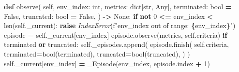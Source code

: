 \documentclass[
  american,
  11pt,
  letterpaper,
]{article}
\newenvironment{Shaded}{\begin{snugshade}}{\end{snugshade}}
\newcommand{\BuiltInTok}[1]{#1}
\newcommand{\ControlFlowTok}[1]{\textcolor[rgb]{0.13,0.29,0.53}{\textbf{#1}}}
\newcommand{\DecValTok}[1]{\textcolor[rgb]{0.00,0.00,0.81}{#1}}
\newcommand{\KeywordTok}[1]{\textcolor[rgb]{0.13,0.29,0.53}{\textbf{#1}}}
\newcommand{\NormalTok}[1]{#1}
\newcommand{\OperatorTok}[1]{\textcolor[rgb]{0.81,0.36,0.00}{\textbf{#1}}}
\newcommand{\PreprocessorTok}[1]{\textcolor[rgb]{0.56,0.35,0.01}{\textit{#1}}}
\newcommand{\SpecialCharTok}[1]{\textcolor[rgb]{0.81,0.36,0.00}{\textbf{#1}}}
\newcommand{\SpecialStringTok}[1]{\textcolor[rgb]{0.31,0.60,0.02}{#1}}
\newcommand{\VariableTok}[1]{\textcolor[rgb]{0.00,0.00,0.00}{#1}}
\renewenvironment{Shaded}{\par\smallskip}{\par\smallskip}
\begin{document}
\begin{Shaded}
\begin{Highlighting}[]
    \KeywordTok{def}\NormalTok{ observe(}
        \VariableTok{self}\NormalTok{,}
\NormalTok{        env\_index: }\BuiltInTok{int}\NormalTok{,}
\NormalTok{        metrics: }\BuiltInTok{dict}\NormalTok{[}\BuiltInTok{str}\NormalTok{, Any],}
\NormalTok{        terminated: }\BuiltInTok{bool} \OperatorTok{=} \VariableTok{False}\NormalTok{,}
\NormalTok{        truncated: }\BuiltInTok{bool} \OperatorTok{=} \VariableTok{False}\NormalTok{,}
\NormalTok{    ) }\OperatorTok{{-}\textgreater{}} \VariableTok{None}\NormalTok{:}
        \ControlFlowTok{if} \KeywordTok{not} \DecValTok{0} \OperatorTok{\textless{}=}\NormalTok{ env\_index }\OperatorTok{\textless{}} \BuiltInTok{len}\NormalTok{(}\VariableTok{self}\NormalTok{.\_current):}
            \ControlFlowTok{raise} \PreprocessorTok{IndexError}\NormalTok{(}\SpecialStringTok{f"env\_index out of range: }\SpecialCharTok{\{}\NormalTok{env\_index}\SpecialCharTok{\}}\SpecialStringTok{"}\NormalTok{)}
\NormalTok{        episode }\OperatorTok{=} \VariableTok{self}\NormalTok{.\_current[env\_index]}
\NormalTok{        episode.observe(metrics, }\VariableTok{self}\NormalTok{.criteria)}
        \ControlFlowTok{if}\NormalTok{ terminated }\KeywordTok{or}\NormalTok{ truncated:}
            \VariableTok{self}\NormalTok{.\_episodes.append(}
\NormalTok{                episode.finish(}
                    \VariableTok{self}\NormalTok{.criteria,}
\NormalTok{                    terminated}\OperatorTok{=}\BuiltInTok{bool}\NormalTok{(terminated),}
\NormalTok{                    truncated}\OperatorTok{=}\BuiltInTok{bool}\NormalTok{(truncated),}
\NormalTok{                )}
\NormalTok{            )}
            \VariableTok{self}\NormalTok{.\_current[env\_index] }\OperatorTok{=}\NormalTok{ \_Episode(env\_index, episode.index }\OperatorTok{+} \DecValTok{1}\NormalTok{)}


\end{Highlighting}
\end{Shaded}
\end{document}
